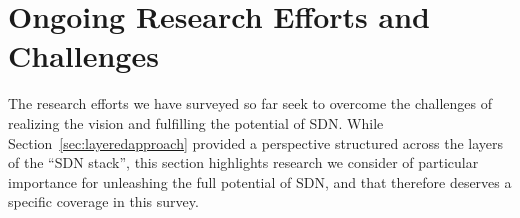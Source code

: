 \section{Ongoing Research Efforts and Challenges}
\label{sec:challenges}

The research efforts we have surveyed so far seek to overcome the challenges of realizing the vision and fulfilling the potential of SDN.
While Section~\ref{sec:layeredapproach} provided a perspective structured across the layers of the ``SDN stack'', this
section highlights research we consider of particular importance for unleashing the full potential of SDN, and that therefore deserves a specific coverage in this survey.

